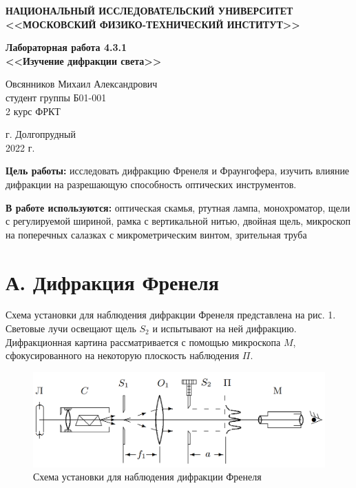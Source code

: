 \documentclass[a4paper,12pt]{article} %
\begin{document}
	
	
	\begin{center}
		
		
		\textbf{НАЦИОНАЛЬНЫЙ ИССЛЕДОВАТЕЛЬСКИЙ УНИВЕРСИТЕТ \\ <<МОСКОВСКИЙ ФИЗИКО-ТЕХНИЧЕСКИЙ ИНСТИТУТ>>}
		\vspace{13ex}
		
		\textbf{Лабораторная работа 4.3.1\\ <<Изучение дифракции света>>}
		\vspace{40ex}
		
		\normalsize{Овсянников Михаил Александрович \\ студент группы Б01-001\\ 2 курс ФРКТ\\}
	\end{center}
	
	\vfill 
	
	\begin{center}
		г. Долгопрудный\\ 
		2022 г.
	\end{center}
	
	
	\thispagestyle{empty} %
	\newpage
	
	\textbf{Цель работы:} исследовать дифракцию Френеля и Фраунгофера, изучить влияние дифракции на разрешающую способность оптических инструментов.
	
	\textbf{В работе используются:} оптическая скамья, ртутная лампа, монохроматор, щели с регулируемой шириной, рамка с вертикальной нитью, двойная щель, микроскоп на поперечных салазках с микрометрическим винтом, зрительная труба
	
	\section*{А. Дифракция Френеля}
	Схема установки для наблюдения дифракции Френеля представлена на рис. 1. Световые лучи освещают щель $S_2$ и испытывают на ней дифракцию. Дифракционная картина рассматривается с помощью микроскопа $M$, сфокусированного на некоторую плоскость наблюдения $\Pi$.
	
	\begin{figure}[h!]
		\centering
		\includegraphics[scale=0.6]{Pictures/Frenel}
		\caption{Схема установки для наблюдения дифракции Френеля}
	\end{figure}
\end{document}
